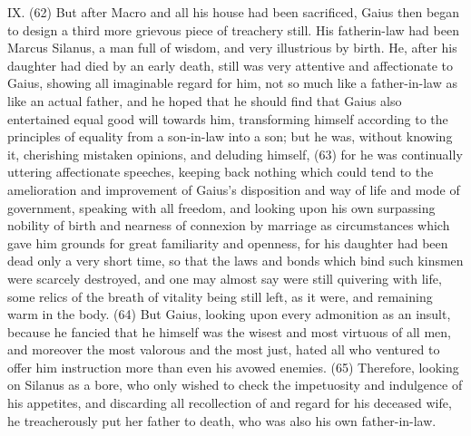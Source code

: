 IX. (62) But after Macro and all his house had been sacrificed, Gaius then began to design a third
more grievous piece of treachery still. His fatherin-law had been Marcus Silanus, a man full of
wisdom, and very illustrious by birth. He, after his daughter had died by an early death, still was
very attentive and affectionate to Gaius, showing all imaginable regard for him, not so much like a
father-in-law as like an actual father, and he hoped that he should find that Gaius also entertained
equal good will towards him, transforming himself according to the principles of equality from a
son-in-law into a son; but he was, without knowing it, cherishing mistaken opinions, and deluding
himself, (63) for he was continually uttering affectionate speeches, keeping back nothing which
could tend to the amelioration and improvement of Gaius's disposition and way of life and mode of
government, speaking with all freedom, and looking upon his own surpassing nobility of birth and
nearness of connexion by marriage as circumstances which gave him grounds for great familiarity
and openness, for his daughter had been dead only a very short time, so that the laws and bonds
which bind such kinsmen were scarcely destroyed, and one may almost say were still quivering
with life, some relics of the breath of vitality being still left, as it were, and remaining warm in the
body. (64) But Gaius, looking upon every admonition as an insult, because he fancied that he
himself was the wisest and most virtuous of all men, and moreover the most valorous and the most
just, hated all who ventured to offer him instruction more than even his avowed enemies. (65)
Therefore, looking on Silanus as a bore, who only wished to check the impetuosity and indulgence
of his appetites, and discarding all recollection of and regard for his deceased wife, he
treacherously put her father to death, who was also his own father-in-law.


